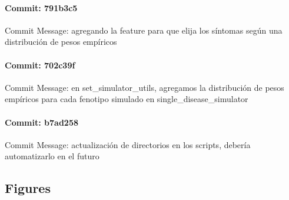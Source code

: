 \documentclass{article}
\begin{document}
\paragraph{Commit: 791b3c5}
Commit Message: agregando la feature para que elija los síntomas según una distribución de pesos empíricos

\paragraph{Commit: 702c39f}
Commit Message: en set_simulator_utils, agregamos la distribución de pesos empíricos para cada fenotipo simulado en single_disease_simulator

\paragraph{Commit: b7ad258}
Commit Message: actualización de directorios en los scripts, debería automatizarlo en el futuro

\subsection{Figures}
\end{document}
